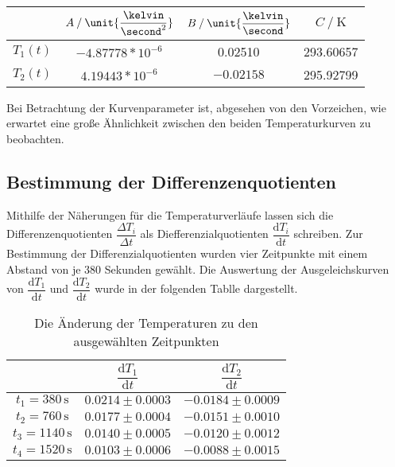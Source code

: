 \begin{table}[H]
  \centering
  \label{tab:ApproxTemp}
  \begin{tabular}{S S S[table-format=2.5] S[table-format=3.5]}
    \toprule
    & {$A \mathbin{/} \unit{\dfrac{\kelvin}{\second^2}}$} 
    & {$B \mathbin{/} \unit{\dfrac{\kelvin}{\second}}$} 
    & {$C \mathbin{/} \unit{\kelvin}$} \\
    \midrule
    {$T_1(t)$} & {$-4.87778*10^{-6}$} & {0.02510}     & {293.60657} \\
    {$T_2(t)$} &  {$4.19443*10^{-6}$} & {$-0.02158$}  &  {295.92799} \\
    \bottomrule
  \end{tabular}
\end{table}
Bei Betrachtung der Kurvenparameter ist, abgesehen von den Vorzeichen, wie erwartet eine große Ähnlichkeit zwischen den
beiden Temperaturkurven zu beobachten.

\newpage

\subsection{Bestimmung der Differenzenquotienten}

Mithilfe der Näherungen für die Temperaturverläufe lassen sich die Differenzenquotienten $\dfrac{ΔT_i}{Δt}$ als Diefferenzialquotienten
$\dfrac{\text{d}T_i}{\text{d}t}$ schreiben.
Zur Bestimmung der Differenzialquotienten wurden vier Zeitpunkte mit einem Abstand von je 380 Sekunden gewählt.
Die Auswertung der Ausgeleichskurven von $\dfrac{\text{d}T_1}{\text{d}t}$ und $\dfrac{\text{d}T_2}{\text{d}t}$ wurde in der folgenden Tablle dargestellt.

\begin{table}[H]
  \centering
  \label{tab:Diffquo}
  \begin{tabular}{S S S}
    \toprule
    & {$\dfrac{\text{d}T_1}{\text{d}t}$} & {$\dfrac{\text{d}T_2}{\text{d}t}$} \\
    \midrule
    {$t_1 = 380  \, \unit{\second}$} & {$0.0214 \pm 0.0003$} & {$-0.0184 \pm 0.0009$} \\
    {$t_2 = 760  \, \unit{\second}$} & {$0.0177 \pm 0.0004$} & {$-0.0151 \pm 0.0010$} \\
    {$t_3 = 1140 \, \unit{\second}$} & {$0.0140 \pm 0.0005$} & {$-0.0120 \pm 0.0012$} \\
    {$t_4 = 1520 \, \unit{\second}$} & {$0.0103 \pm 0.0006$} & {$-0.0088 \pm 0.0015$} \\
    \bottomrule
  \end{tabular}
  \caption{Die Änderung der Temperaturen zu den ausgewählten Zeitpunkten}
\end{table}

